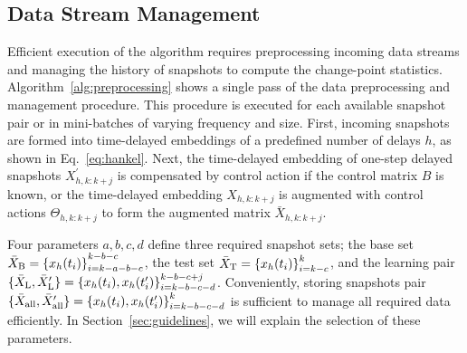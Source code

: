 \subsection{Data Stream Management}
Efficient execution of the algorithm requires preprocessing incoming data streams and managing the history of snapshots to compute the change-point statistics. Algorithm~\ref{alg:preprocessing} shows a single pass of the data preprocessing and management procedure. This procedure is executed for each available snapshot pair or in mini-batches of varying frequency and size. First, incoming snapshots are formed into time-delayed embeddings of a predefined number of delays \( h \), as shown in Eq.~\eqref{eq:hankel}. Next, the time-delayed embedding of one-step delayed snapshots \( X^\prime_{h, k: k + j} \) is compensated by control action if the control matrix \( B \) is known, or the time-delayed embedding \( X_{h, k: k + j} \) is augmented with control actions \( \Theta_{h, k: k + j} \) to form the augmented matrix \( \bar{X}_{h, k: k + j} \).

Four parameters \(a, b, c, d\) define three required snapshot sets; the base set \({\bar{X} _{\text{B}} = \{x_h(t_i)\}}^{k - b - c}_{i=k - a - b - c}\), the test set \(\bar{X} _{\text{T}} = {\{x_h(t_i)\}}^{k}_{i=k - c}\), and the learning pair \( \{\bar{X} _{\text{L}}, \bar{X}^\prime _{\text{L}}\} = {\{x_h(t_i), x_h(t_i^\prime )\}}^{k - b - c + j}_{i=k - b - c - d}\). Conveniently, storing snapshots pair \( \{\bar{X} _{\text{all}}, \bar{X}^\prime _{\text{all}}\} = {\{x_h(t_i), x_h(t_i^\prime )\}}^{k}_{i=k - b - c - d}\) is sufficient to manage all required data efficiently. In Section~\ref{sec:guidelines}, we will explain the selection of these parameters.

